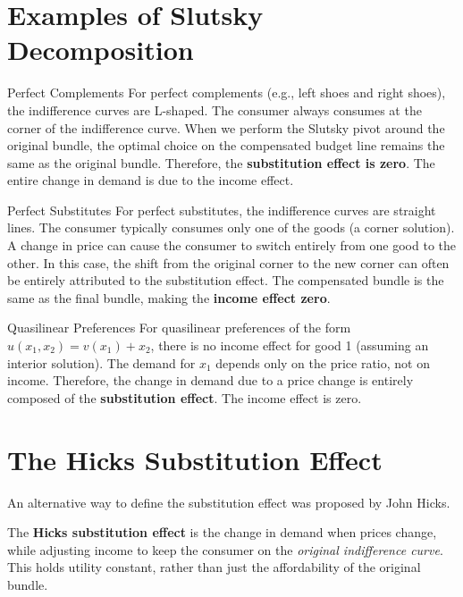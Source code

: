 \section{Examples of Slutsky Decomposition}

\begin{examplebox}{Perfect Complements}
For perfect complements (e.g., left shoes and right shoes), the indifference curves are L-shaped. The consumer always consumes at the corner of the indifference curve. When we perform the Slutsky pivot around the original bundle, the optimal choice on the compensated budget line remains the same as the original bundle. Therefore, the \textbf{substitution effect is zero}. The entire change in demand is due to the income effect.
\end{examplebox}

\begin{examplebox}{Perfect Substitutes}
For perfect substitutes, the indifference curves are straight lines. The consumer typically consumes only one of the goods (a corner solution). A change in price can cause the consumer to switch entirely from one good to the other. In this case, the shift from the original corner to the new corner can often be entirely attributed to the substitution effect. The compensated bundle is the same as the final bundle, making the \textbf{income effect zero}.
\end{examplebox}

\begin{examplebox}{Quasilinear Preferences}
For quasilinear preferences of the form \(u(x_1, x_2) = v(x_1) + x_2\), there is no income effect for good 1 (assuming an interior solution). The demand for \(x_1\) depends only on the price ratio, not on income. Therefore, the change in demand due to a price change is entirely composed of the \textbf{substitution effect}. The income effect is zero.
\end{examplebox}

\section{The Hicks Substitution Effect}
An alternative way to define the substitution effect was proposed by John Hicks.

\begin{definition}
The \textbf{Hicks substitution effect} is the change in demand when prices change, while adjusting income to keep the consumer on the \textit{original indifference curve}. This holds utility constant, rather than just the affordability of the original bundle.
\end{definition}

